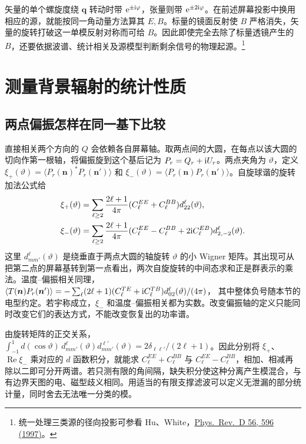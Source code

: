 矢量的单个螺旋度绕 $\bm q$ 转动时带 $\mathrm{e}^{\pm\mathrm{i}\varphi}$，张量则带 $\mathrm{e}^{\pm2\mathrm{i}\varphi}$。在前述屏幕投影中换用相应的源，就能按同一角动量方法算其 $E,B$。标量的镜面反射使 $B$ 严格消失，矢量的旋转打破这一单模反射对称而可给 $B$。因此即使完全去除了标量透镜产生的 $B$，还要依据波谱、统计相关及源模型判断剩余信号的物理起源。\footnote{统一处理三类源的径向投影可参看 Hu、White，\href{https://doi.org/10.1103/PhysRevD.56.596}{Phys.\ Rev.\ D 56, 596 (1997)}。}

\section{测量背景辐射的统计性质}\label{sec:cosmo-cmb-inference}


\subsection{两点偏振怎样在同一基下比较}

直接相关两个方向的 $Q$ 会依赖各自屏幕轴。取两点间的大圆，在每点以该大圆的切向作第一根轴，将偏振旋到这个基后记为 $P_r=Q_r+\mathrm{i} U_r$。两点夹角为 $\vartheta$，定义 $\xi_+(\vartheta)=\langle P_r(\bm n)^*P_r(\bm n')\rangle$ 和 $\xi_-(\vartheta)=\langle P_r(\bm n)P_r(\bm n')\rangle$。自旋球谐的旋转加法公式给
\begin{align*}
 \xi_+(\vartheta)
 &=\sum_{\ell\ge2}\frac{2\ell+1}{4\pi}
               (C_\ell^{EE}+C_\ell^{BB})d^\ell_{22}(\vartheta),\\
 \xi_-(\vartheta)
 &=\sum_{\ell\ge2}\frac{2\ell+1}{4\pi}
        (C_\ell^{EE}-C_\ell^{BB}+2\mathrm{i} C_\ell^{EB})
                                     d^\ell_{2,-2}(\vartheta).
\end{align*}
这里 $d^\ell_{mm'}(\vartheta)$ 是绕垂直于两点大圆的轴旋转 $\vartheta$ 的小 Wigner 矩阵。其出现可从把第二点的屏幕基转到第一点看出，两次自旋旋转的中间态求和正是群表示的乘法。温度--偏振相关同理，
$\langle T(\bm n)P_r(\bm n')\rangle
=-\sum_\ell(2\ell+1)(C_\ell^{TE}+\mathrm{i} C_\ell^{TB})d^\ell_{02}(\vartheta)/(4\pi)$，
其中整体负号随本节的电型约定。若宇称成立，$\xi_-$ 和温度--偏振相关都为实数。改变偏振轴的定义只能同时改变它们的表达方式，不能改变恢复出的功率谱。

由旋转矩阵的正交关系，
$\int_{-1}^1d(\cos\vartheta)\,d^\ell_{mm'}(\vartheta)d^{\ell'}_{mm'}(\vartheta)
=2\delta_{\ell\ell'}/(2\ell+1)$。因此分别将 $\xi_+$、$\operatorname{Re}\xi_-$ 乘对应的 $d$ 函数积分，就能求 $C_\ell^{EE}+C_\ell^{BB}$ 与 $C_\ell^{EE}-C_\ell^{BB}$，相加、相减再除以二即可分开两谱。若只测有限的角间隔，缺失积分使这种分离产生模混合，与有边界天图的电、磁型歧义相同。用适当的有限支撑滤波可以定义无泄漏的部分统计量，同时舍去无法唯一分类的模。

